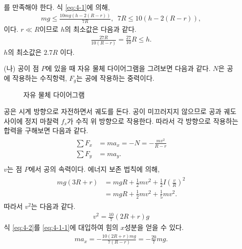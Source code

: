 \documentclass[floatfix,nofootinbib,superscriptaddress,fleqn]{revtex4-2}
\begin{document}
\begin{itemize}
\begin{align}
  \end{align}
  를 만족해야 한다. 식 \eqref{eq:4-1}에 의해,
  \begin{align}
    mg\leq \frac{10mg(h-2(R-r))}{7R},\,\,\, 7R\leq 10(h-2(R-r)),
  \end{align}
  이다. $r\ll R$이므로 $h$의 최소값은 다음과 같다.
  \begin{align}
    \frac{27R}{10(R-r)}=\frac{27}{10}R\leq h.
  \end{align}
  $h$의 최소값은 $2.7R$ 이다.
  \item[(나)] 공이 점 $P$에 있을 때 자유 물체 다이어그램을 그려보면 다음과 같다.
  $N$은 공에 작용하는 수직항력, $F_g$는 공에 작용하는 중력이다.
  \begin{figure}[htp]
    \centering
    \caption{자유 물체 다이어그램}
    \label{fig:11}
  \end{figure}
  
  공은 시계 방향으로 자전하면서 궤도를 돈다. 공이 미끄러지지 않으므로 공과 궤도 사이에 
  정지 마찰력 $f_s$가 수직 위 방향으로 작용한다.
  따라서 각 방향으로 작용하는 합력을 구해보면 다음과 같다.
  \begin{align}\label{eq:4-1-1}
    \begin{split}
      \sum F_x &= ma_x = -N = -\frac{mv^2}{R-r}    \\ 
      \sum F_y &= ma_y .  \\ 
    \end{split}
  \end{align}
  $v$는 점 $P$에서 공의 속력이다. 
  에너지 보존 법칙에 의해,
  \begin{align}
    \begin{split}
      mg(3R+r) &= mgR + \frac{1}{2}mv^2 + \frac{1}{2}I\left(\frac{v}{R}\right)^2  \\
      &= mgR + \frac{1}{2}mv^2 + \frac{1}{5}mv^2.
    \end{split}
  \end{align}
  따라서 $v^2$는 다음과 같다.
  \begin{align}\label{eq:4-2}
    v^2 = \frac{10}{7}(2R+r)g
  \end{align}
  식 \eqref{eq:4-2}를 \eqref{eq:4-1-1}에 대입하여 힘의 $x$성분을 얻을 수 있다.
  \begin{align}
    ma_x = -\frac{10(2R+r)mg}{7(R-r)} = -\frac{20}{7}mg.
  \end{align}
  

\end{itemize}
\end{document}
